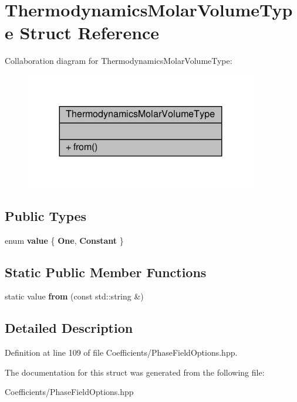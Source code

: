 \hypertarget{structThermodynamicsMolarVolumeType}{}\section{Thermodynamics\+Molar\+Volume\+Type Struct Reference}
\label{structThermodynamicsMolarVolumeType}


Collaboration diagram for Thermodynamics\+Molar\+Volume\+Type\+:\nopagebreak
\begin{figure}[H]
\begin{center}
\leavevmode
\includegraphics[width=287pt]{structThermodynamicsMolarVolumeType__coll__graph}
\end{center}
\end{figure}
\subsection*{Public Types}
\begin{DoxyCompactItemize}
\item 
\mbox{\label{structThermodynamicsMolarVolumeType_af3def88f65ec497963249f47c6ec0e7f}} 
enum {\bfseries value} \{ {\bfseries One}, 
{\bfseries Constant}
 \}
\end{DoxyCompactItemize}
\subsection*{Static Public Member Functions}
\begin{DoxyCompactItemize}
\item 
\mbox{\label{structThermodynamicsMolarVolumeType_a0534286941bdf9eb1c7b5dd6fda25a09}} 
static value {\bfseries from} (const std\+::string \&)
\end{DoxyCompactItemize}


\subsection{Detailed Description}


Definition at line 109 of file Coefficients/\+Phase\+Field\+Options.\+hpp.



The documentation for this struct was generated from the following file\+:\begin{DoxyCompactItemize}
\item 
Coefficients/\+Phase\+Field\+Options.\+hpp\end{DoxyCompactItemize}
